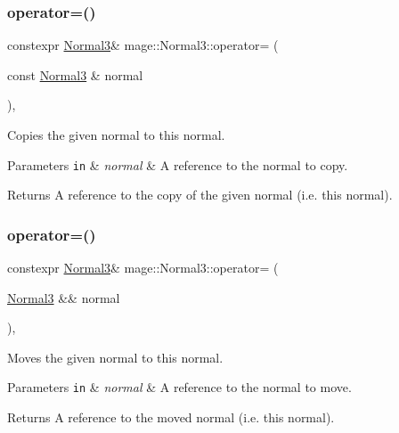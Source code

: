 \subsubsection{\texorpdfstring{operator=()}{operator=()}\hspace{0.1cm}{\footnotesize\ttfamily [1/2]}}
{\footnotesize\ttfamily constexpr \mbox{\hyperlink{structmage_1_1_normal3}{Normal3}}\& mage\+::\+Normal3\+::operator= (\begin{DoxyParamCaption}\item[{const \mbox{\hyperlink{structmage_1_1_normal3}{Normal3}} \&}]{normal }\end{DoxyParamCaption})\hspace{0.3cm}{\ttfamily [default]}, {\ttfamily [noexcept]}}

Copies the given normal to this normal.


\begin{DoxyParams}[1]{Parameters}
\mbox{\tt in}  & {\em normal} & A reference to the normal to copy. \\
\hline
\end{DoxyParams}
\begin{DoxyReturn}{Returns}
A reference to the copy of the given normal (i.\+e. this normal). 
\end{DoxyReturn}
\mbox{\label{structmage_1_1_normal3_a59aca1c2a1eb936c36bce64b4b5936b9}} 
\subsubsection{\texorpdfstring{operator=()}{operator=()}\hspace{0.1cm}{\footnotesize\ttfamily [2/2]}}
{\footnotesize\ttfamily constexpr \mbox{\hyperlink{structmage_1_1_normal3}{Normal3}}\& mage\+::\+Normal3\+::operator= (\begin{DoxyParamCaption}\item[{\mbox{\hyperlink{structmage_1_1_normal3}{Normal3}} \&\&}]{normal }\end{DoxyParamCaption})\hspace{0.3cm}{\ttfamily [default]}, {\ttfamily [noexcept]}}

Moves the given normal to this normal.


\begin{DoxyParams}[1]{Parameters}
\mbox{\tt in}  & {\em normal} & A reference to the normal to move. \\
\hline
\end{DoxyParams}
\begin{DoxyReturn}{Returns}
A reference to the moved normal (i.\+e. this normal). 
\end{DoxyReturn}
